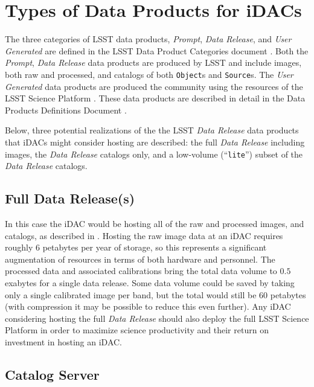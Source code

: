 \section{Types of Data Products for iDACs}\label{sec:data}

The three categories of LSST data products, {\it Prompt}, {\it Data Release}, and {\it User Generated} are defined in the LSST Data Product Categories document  .
Both the {\it Prompt}, {\it Data Release} data products are produced by LSST and include images, both raw and processed, and catalogs of both {\tt Object}s and {\tt Source}s.
The  {\it User Generated} data products are produced the community using the resources of the LSST Science Platform .
These data products are described in detail in the Data Products Definitions Document .

Below, three potential realizations of the the LSST {\it Data Release} data products that iDACs might consider hosting are described: the full {\it Data Release} including images, the {\it Data Release} catalogs only, and a low-volume (``{\tt lite}'') subset of the {\it Data Release} catalogs.

\subsection{Full Data Release(s)}

In this case the iDAC would be hosting all of the raw and processed images, and catalogs, as described in . Hosting the raw image data at an iDAC requires roughly $6$ petabytes per year of storage, so this represents a significant augmentation of resources in terms of both hardware and personnel. The processed data and associated calibrations bring the total data volume to $0.5$ exabytes for a single data release. Some data volume could be saved by taking only a single calibrated image per band, but the total would still be $60$ petabytes (with compression it may be possible to reduce this even further). Any iDAC considering hosting the full {\it Data Release} should also deploy the full LSST Science Platform  in order to maximize science productivity and their return on investment in hosting an iDAC.

\subsection{Catalog Server}

